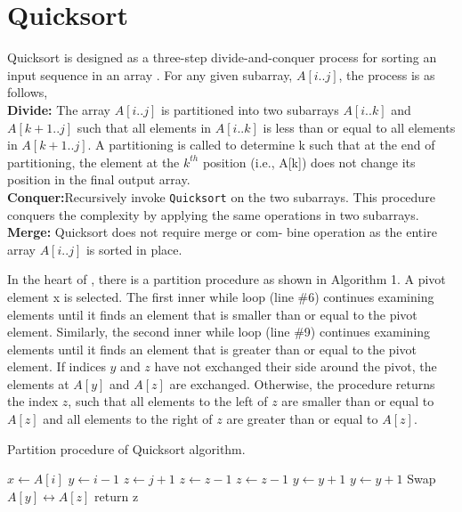 \documentclass[a4paper, 10pt,twocolumn]{article}
\begin{document}
\section{Quicksort}
Quicksort is designed as a three-step divide-and-conquer process for sorting an input sequence in an array \cite{one}. For any given subarray, $A[i .. j]$, the process is as follows,\\
\textbf{Divide:} The array $A[i..j]$ is partitioned into two subarrays $A[i..k]$ and $A[k+1..j]$ such that all elements in $A[i..k]$ is less than or equal to all elements in $A[k+1..j]$. A partitioning is called to determine k such that at the end of partitioning, the element at the $k^{th}$ position (i.e., A[k]) does not change its position in the final output array.\\
\textbf{Conquer:}Recursively invoke \texttt{Quicksort} on the two subarrays. This procedure conquers the complexity by applying the same operations in two subarrays.\\

\noindent
\textbf{Merge:} Quicksort does not require merge or com-
bine operation as the entire array $A[i..j]$ is sorted
in place.

In the heart of , there is a partition procedure as shown in Algorithm 1. A pivot element x is selected. The first inner while loop (line \#6) continues examining elements until it finds an element that is smaller than or equal to the pivot element. Similarly, the second inner while loop (line \#9) continues examining elements until it finds an element that is greater than or equal to the pivot element. If indices $y$ and $z$ have not exchanged their side around the pivot, the elements at $A[y]$ and $A[z]$ are exchanged. Otherwise, the procedure returns the index $z$, such that all elements to the left of $z$ are smaller than or equal to $A[z]$ and all elements to the right of $z$ are greater than or equal to $A[z]$.

\begin{algorithm}[t]
  \caption{Partition procedure of Quicksort algorithm.}
  \label{alg:in1}
  \begin{algorithmic}[1]
     \newline
     \newline
      \State $x \leftarrow A[i]$
      \State $y \leftarrow i-1$
      \State $z \leftarrow j+1$
          \State $z \leftarrow z-1$
              \State $z \leftarrow z-1$
          \EndWhile
          \State $y \leftarrow y+1$
              \State $y \leftarrow y+1$
          \EndWhile
            \State Swap $A[y] \leftrightarrow A[z]$
          \Else
            \State return z
          \EndIf
      \EndWhile
     \EndProcedure    
   \end{algorithmic}
\end{algorithm}
\end{document}
